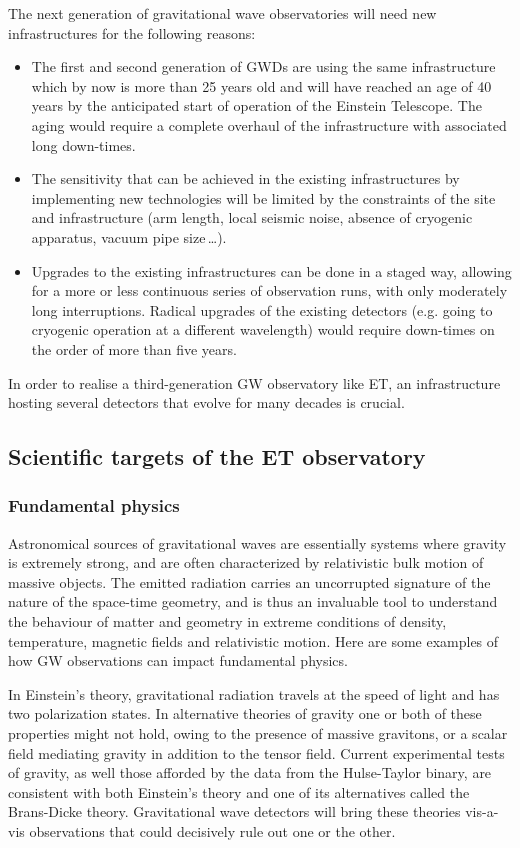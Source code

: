 The next generation of gravitational wave observatories will need new infrastructures for the following reasons:
\begin{itemize}
    \item The first and second generation of GWDs are using the same infrastructure which by now is more than 25 years old and will have reached an age of 40 years by the anticipated start of operation of the Einstein Telescope. The aging would require a complete overhaul of the infrastructure with associated long down-times.
    \item The sensitivity that can be achieved in the existing infrastructures by implementing new technologies will be limited by the constraints of the site and infrastructure (arm length, local seismic noise, absence of cryogenic apparatus, vacuum pipe size\,\ldots).
    \item Upgrades to the existing infrastructures can be done in a staged way, allowing for a more or less continuous series of observation runs, with only moderately long interruptions. Radical upgrades of the existing detectors (e.g. going to cryogenic operation at a different wavelength) would require down-times on the order of more than five years. 
\end{itemize} 
In order to realise a third-generation GW observatory like ET, an infrastructure hosting several detectors that evolve for many decades is crucial.

\clearpage

\subsection{Scientific targets of the ET observatory}
\subsubsection{Fundamental physics}
\label{ScienceCase:FundamentalPhysics}
Astronomical sources of gravitational waves are essentially systems where gravity is extremely strong, and are often characterized by relativistic
bulk motion of massive objects. The emitted radiation carries an uncorrupted signature of the nature of the space-time geometry, and is thus an invaluable tool to understand the behaviour of matter and geometry in extreme conditions of density, temperature, magnetic fields and relativistic motion. Here are some examples of how GW observations can impact fundamental physics.

In Einstein's theory, gravitational radiation travels at the speed 
of light and has two polarization states. In alternative theories 
of gravity one or both of these properties might not hold, owing 
to the presence of massive gravitons, or a scalar field mediating 
gravity in addition to the tensor field. Current experimental
tests of gravity, as well those afforded by the data from the
Hulse-Taylor binary, are consistent with both Einstein's theory
and one of its alternatives called the Brans-Dicke theory.
Gravitational wave detectors will bring these theories
vis-a-vis observations that could decisively rule out one
or the other.

